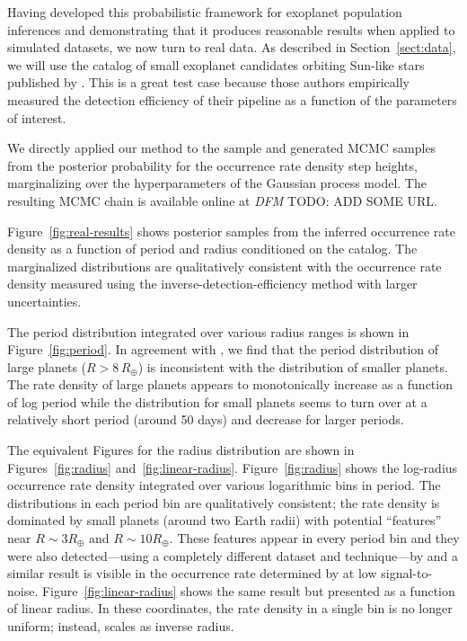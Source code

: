 \documentclass[12pt,preprint]{aastex}
\newcommand{\figref}[1]{\ref{fig:#1}}
\newcommand{\Fig}[1]{Figure~\figref{#1}}
\newcommand{\fig}[1]{\Fig{#1}}
\newcommand{\Sect}[1]{Section~\ref{sect:#1}}
\newcommand{\sect}[1]{\Sect{#1}}
\newcommand{\todo}[3]{{\color{#2} \emph{#1} TODO: #3}}
\newcommand{\dfmtodo}[1]{\todo{DFM}{red}{#1}}
\newcommand{\radius}{\ensuremath{R}}
\begin{document}
Having developed this probabilistic framework for exoplanet population
inferences and demonstrating that it produces reasonable results when applied
to simulated datasets, we now turn to real data.
As described in \sect{data}, we will use the catalog of small exoplanet
candidates orbiting Sun-like stars published by \citet{petigura}.
This is a great test case because those authors empirically measured the
detection efficiency of their pipeline as a function of the parameters of
interest.

We directly applied our method to the \citet{petigura} sample and generated
MCMC samples from the posterior probability for the occurrence rate density
step heights, marginalizing over the hyperparameters of the Gaussian process
model.
The resulting MCMC chain is available online at \dfmtodo{ADD SOME URL}.

\Fig{real-results} shows posterior samples from the inferred occurrence rate
density as a function of period and radius conditioned on the catalog.
The marginalized distributions are qualitatively consistent with the
occurrence rate density measured using the inverse-detection-efficiency
method with larger uncertainties.

The period distribution integrated over various radius ranges is shown in
\fig{period}.
In agreement with \citet{dong}, we find that the period distribution of large
planets ($R > 8\,R_\oplus$) is inconsistent with the distribution of smaller
planets.
The rate density of large planets appears to monotonically increase as a
function of log period while the distribution for small planets seems to turn
over at a relatively short period (around 50 days) and decrease for larger
periods.

The equivalent Figures for the radius distribution are shown in
Figures~\figref{radius} and~\figref{linear-radius}.
\Fig{radius} shows the log-radius occurrence rate density integrated over
various logarithmic bins in period.
The distributions in each period bin are qualitatively consistent; the
rate density is dominated by small planets (around two Earth radii) with
potential ``features'' near $\radius\sim3\radius_\oplus$ and $\radius\sim
10\radius_\oplus$.
These features appear in every period bin and they were also detected---using
a completely different dataset and technique---by \citet{dong} and a similar
result is visible in the occurrence rate determined by \citet[][their Figure
7]{fressin-fp} at low signal-to-noise.
\Fig{linear-radius} shows the same result but presented as a function of
linear radius.
In these coordinates, the rate density in a single bin is no longer
uniform; instead, scales as inverse radius.
\end{document}
